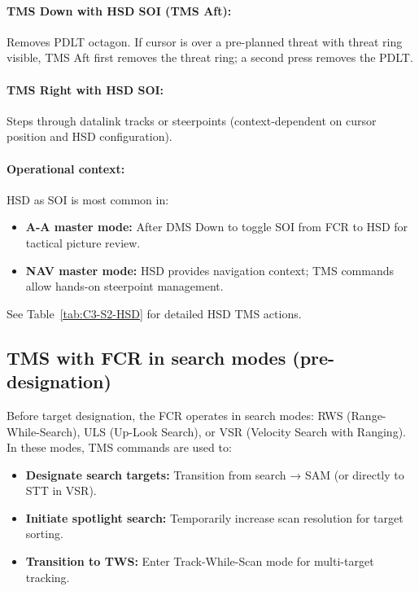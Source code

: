 \documentclass[11pt, a4paper, twoside]{report}
\begin{document}
\paragraph{TMS Down with HSD SOI (TMS Aft):}
Removes PDLT octagon. If cursor is over a pre-planned threat with threat ring visible, TMS Aft first removes the threat ring; a second press removes the PDLT.

\paragraph{TMS Right with HSD SOI:}
Steps through datalink tracks or steerpoints (context-dependent on cursor position and HSD configuration).

\paragraph{Operational context:}
HSD as SOI is most common in:
\begin{itemize}
    \item \textbf{A-A master mode:} After DMS Down to toggle SOI from FCR to HSD for tactical picture review.
    \item \textbf{NAV master mode:} HSD provides navigation context; TMS commands allow hands-on steerpoint management.
\end{itemize}

See Table~\ref{tab:C3-S2-HSD} for detailed HSD TMS actions.

\subsection{TMS with FCR in search modes (pre-designation)}
\label{sec:C3-S2-S2}

Before target designation, the FCR operates in search modes: RWS (Range-While-Search), ULS (Up-Look Search), or VSR (Velocity Search with Ranging). In these modes, TMS commands are used to:
\begin{itemize}
    \item \textbf{Designate search targets:} Transition from search → SAM (or directly to STT in VSR).
    \item \textbf{Initiate spotlight search:} Temporarily increase scan resolution for target sorting.
    \item \textbf{Transition to TWS:} Enter Track-While-Scan mode for multi-target tracking.
\end{itemize}
\end{document}
